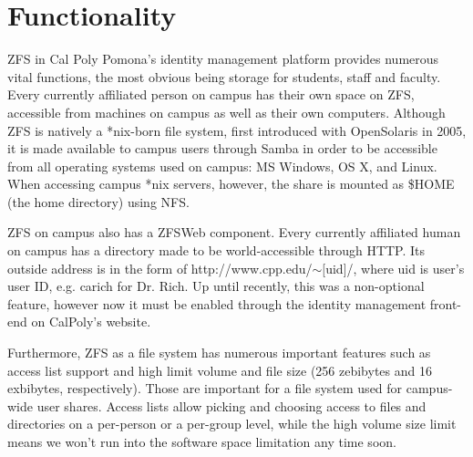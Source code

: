 \section{Functionality}
ZFS in Cal Poly Pomona's identity management platform provides numerous vital functions, the most obvious being storage for students, staff and faculty. Every currently affiliated person on campus has their own space on ZFS, accessible from machines on campus as well as their own computers. Although ZFS is natively a *nix-born file system, first introduced with OpenSolaris in 2005, it is made available to campus users through Samba in order to be accessible from all operating systems used on campus: MS Windows, OS X, and Linux. When accessing campus *nix servers, however, the share is mounted as \$HOME (the home directory) using NFS. 

ZFS on campus also has a ZFSWeb component. Every currently affiliated human on campus has a directory made to be world-accessible through HTTP. Its outside address is in the form of http://www.cpp.edu/$\sim$[uid]/, where uid is user's user ID, e.g. carich for Dr. Rich. Up until recently, this was a non-optional feature, however now it must be enabled through the identity management front-end on CalPoly's website.

Furthermore, ZFS as a file system has numerous important features such as access list support and high limit volume and file size (256 zebibytes and 16 exbibytes, respectively). Those are important for a file system used for campus-wide user shares. Access lists allow picking and choosing access to files and directories on a per-person or a per-group level, while the high volume size limit means we won't run into the software space limitation any time soon. 
